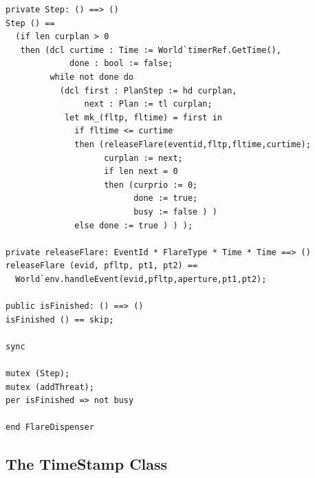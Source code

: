 \documentclass{overturerepchap}
\begin{document}
\begin{lstlisting}
private Step: () ==> ()
Step () ==
  (if len curplan > 0
   then (dcl curtime : Time := World`timerRef.GetTime(),
             done : bool := false;
         while not done do
           (dcl first : PlanStep := hd curplan,
                next : Plan := tl curplan;
            let mk_(fltp, fltime) = first in
              if fltime <= curtime
              then (releaseFlare(eventid,fltp,fltime,curtime);
                    curplan := next;
                    if len next = 0
                    then (curprio := 0; 
                          done := true; 
                          busy := false ) )
              else done := true ) ) );

private releaseFlare: EventId * FlareType * Time * Time ==> ()
releaseFlare (evid, pfltp, pt1, pt2) == 
  World`env.handleEvent(evid,pfltp,aperture,pt1,pt2);

public isFinished: () ==> ()
isFinished () == skip;

sync

mutex (Step);
mutex (addThreat);
per isFinished => not busy
     
end FlareDispenser
\end{lstlisting}


\subsection{The TimeStamp Class}
\end{document}
